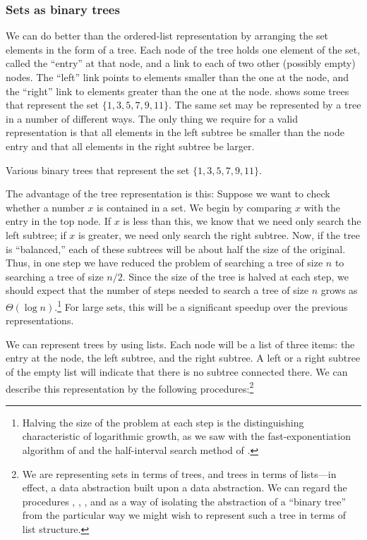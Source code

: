 \subsubsection*{Sets as binary trees}

We can do better than the ordered-list representation by arranging the set
elements in the form of a tree.  Each node of the tree holds one element of the
set, called the ``entry'' at that node, and a link to each of two other
(possibly empty) nodes.  The ``left'' link points to elements smaller than the
one at the node, and the ``right'' link to elements greater than the one at the
node.   shows some trees that represent the set \( \{1, 3, 5,
7, 9, 11\} \).  The same set may be represented by a tree in a number of
different ways.  The only thing we require for a valid representation is that
all elements in the left subtree be smaller than the node entry and that all
elements in the right subtree be larger.

\begin{imageFigure}{Various binary trees that represent the set
  \( \{1, 3, 5, 7, 9, 11\} \).}
  \resizebox{\linewidth}{!}{}
\end{imageFigure}

The advantage of the tree representation is this: Suppose we want to check
whether a number \( x \) is contained in a set.  We begin by comparing \( x \)
with the entry in the top node.  If \( x \) is less than this, we know that we
need only search the left subtree; if \( x \) is greater, we need only search
the right subtree.  Now, if the tree is ``balanced,'' each of these subtrees
will be about half the size of the original.  Thus, in one step we have reduced
the problem of searching a tree of size \( n \) to searching a tree of size \(
n / 2 \). Since the size of the tree is halved at each step, we should expect
that the number of steps needed to search a tree of size \( n \) grows as \(
\Theta(\log n) \).\footnote{Halving the size of the problem at each step is the
distinguishing characteristic of logarithmic growth, as we saw with the
fast-exponentiation algorithm of  and the half-interval
search method of .} For large sets, this will be a
significant speedup over the previous representations.

We can represent trees by using lists.  Each node will be a list of three
items: the entry at the node, the left subtree, and the right subtree.  A left
or a right subtree of the empty list will indicate that there is no subtree
connected there.  We can describe this representation by the following
procedures:\footnote{We are representing sets in terms of trees, and trees in
terms of lists---in effect, a data abstraction built upon a data abstraction.
We can regard the procedures , ,
, and  as a way of isolating the
abstraction of a ``binary tree'' from the particular way we might wish to
represent such a tree in terms of list structure.}

